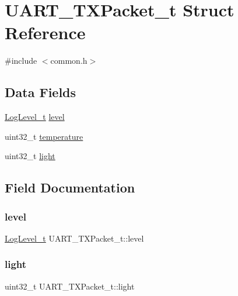 \hypertarget{struct_u_a_r_t___t_x_packet__t}{}\section{U\+A\+R\+T\+\_\+\+T\+X\+Packet\+\_\+t Struct Reference}
\label{struct_u_a_r_t___t_x_packet__t}


{\ttfamily \#include $<$common.\+h$>$}

\subsection*{Data Fields}
\begin{DoxyCompactItemize}
\item 
\mbox{\hyperlink{common_8h_a970b145542640dc66bc5ac58861fc4a1}{Log\+Level\+\_\+t}} \mbox{\hyperlink{struct_u_a_r_t___t_x_packet__t_a217e6bb9959c3e0b5ed296be0ad2ff52}{level}}
\item 
uint32\+\_\+t \mbox{\hyperlink{struct_u_a_r_t___t_x_packet__t_a2cbdec2b2e2d42b9dacc50ebcc7e5cf4}{temperature}}
\item 
uint32\+\_\+t \mbox{\hyperlink{struct_u_a_r_t___t_x_packet__t_a7f9904c8a47293000677723ddfed8823}{light}}
\end{DoxyCompactItemize}


\subsection{Field Documentation}
\mbox{\label{struct_u_a_r_t___t_x_packet__t_a217e6bb9959c3e0b5ed296be0ad2ff52}} 
\subsubsection{\texorpdfstring{level}{level}}
{\footnotesize\ttfamily \mbox{\hyperlink{common_8h_a970b145542640dc66bc5ac58861fc4a1}{Log\+Level\+\_\+t}} U\+A\+R\+T\+\_\+\+T\+X\+Packet\+\_\+t\+::level}

\mbox{\label{struct_u_a_r_t___t_x_packet__t_a7f9904c8a47293000677723ddfed8823}} 
\subsubsection{\texorpdfstring{light}{light}}
{\footnotesize\ttfamily uint32\+\_\+t U\+A\+R\+T\+\_\+\+T\+X\+Packet\+\_\+t\+::light}

